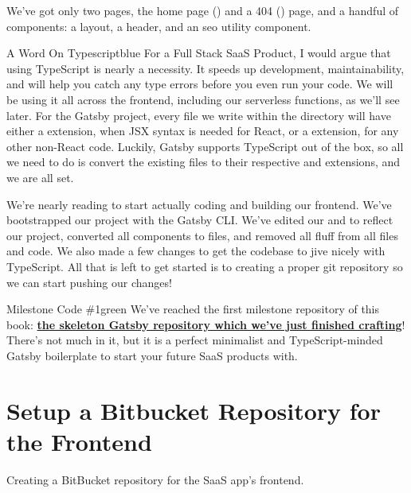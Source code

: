 \documentclass[paper=6in:9in,pagesize=pdftex,headinclude=on,footinclude=on,12pt,twoside]{scrbook}
\newcommand{\link}[2]{\textbf{\textcolor{monokaiPink}{\href{#2}{#1}}}}
\begin{document}
We've got only two pages, the home page () and a 404 () page, and a handful of components: a layout, a header, and an seo utility component.

\begin{highlightBox}{A Word On Typescript}{blue}{\information}
For a Full Stack SaaS Product, I would argue that using TypeScript is nearly a necessity. It speeds up development, maintainability, and will help you catch any type errors before you even run your code. We will be using it all across the frontend, including our serverless functions, as we'll see later.
\newline
\newline
For the Gatsby project, every file we write within the  directory will have either a  extension, when JSX syntax is needed for React, or a  extension, for any other non-React code. Luckily, Gatsby supports TypeScript out of the box, so all we need to do is convert the existing files to their respective  and  extensions, and we are all set.
\end{highlightBox}


We're nearly reading to start actually coding and building our frontend. We've bootstrapped our project with the Gatsby CLI. We've edited our  and  to reflect our project, converted all components to  files, and removed all fluff from all files and code. We also made a few changes to get the codebase to jive nicely with TypeScript. All that is left to get started is to creating a proper git repository so we can start pushing our changes!

\begin{highlightBox}{Milestone Code \#1}{green}{\greenCheck}
We've reached the first milestone repository of this book: \link{the skeleton Gatsby repository which we've just finished crafting}{https://github.com/Full-Stack-SaaS-Product-Cookbook/milestone-1-gatsby-skeleton-project}! There's not much in it, but it is a perfect minimalist and TypeScript-minded Gatsby boilerplate to start your future SaaS products with.
\end{highlightBox}

\section{Setup a Bitbucket Repository for the Frontend}
\begin{arrows}
\item Creating a BitBucket repository for the SaaS app's frontend.
\end{arrows}
\end{document}
